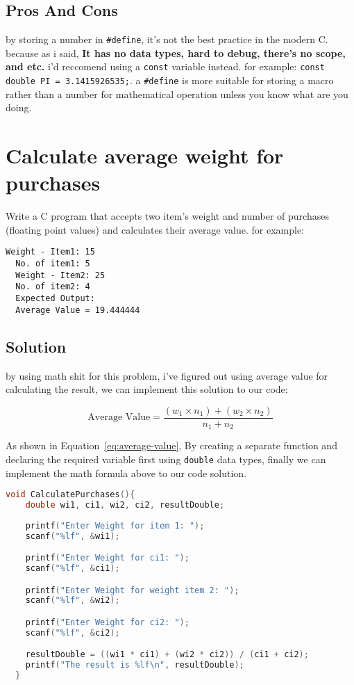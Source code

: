\documentclass{article}
\begin{document}
  \subsection{Pros And Cons}
  
  by storing a number in \texttt{\#define}, it's not the best practice in the modern C. because as i said, \textbf{It has no data types, hard to debug, there's no scope, and etc.} 
  i'd reccomend using a \texttt{const} variable instead. for example: \texttt{const double PI = 3.1415926535;}. a \texttt{\#define} is more suitable for storing a macro rather than a number for mathematical operation unless you know what are you doing.
  
  \section{Calculate average weight for purchases} 
  
  Write a C program that accepts two item's weight and number of purchases (floating point values) and calculates their average value.
  for example: 
  
  \begin{lstlisting}[style=plainstyle]
  Weight - Item1: 15
  No. of item1: 5
  Weight - Item2: 25
  No. of item2: 4
  Expected Output:
  Average Value = 19.444444
  \end{lstlisting}
  
  \subsection{Solution}
  
  by using math shit for this problem, i've figured out using average value for calculating the result, we can implement this solution to our code:
  
  \begin{equation}
  \text{Average Value} = \frac{(w_1 \times n_1) + (w_2 \times n_2)}{n_1 + n_2}
  \label{eq:average-value}
  \end{equation}

  \vspace{2pt}
  
  As shown in Equation~\ref{eq:average-value}, By creating a separate function and declaring the required variable first using \texttt{double} data types, finally we can implement the math formula above
  to our code solution.
  \begin{lstlisting}[language=C, caption=Code Solution]
  void CalculatePurchases(){
    double wi1, ci1, wi2, ci2, resultDouble;
    
    printf("Enter Weight for item 1: ");
    scanf("%lf", &wi1);

    printf("Enter Weight for ci1: ");
    scanf("%lf", &ci1);

    printf("Enter Weight for weight item 2: ");
    scanf("%lf", &wi2);

    printf("Enter Weight for ci2: ");
    scanf("%lf", &ci2);

    resultDouble = ((wi1 * ci1) + (wi2 * ci2)) / (ci1 + ci2);
    printf("The result is %lf\n", resultDouble);
  } 
  \end{lstlisting}
  
\end{document}
